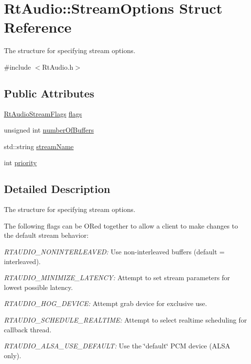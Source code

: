 \hypertarget{struct_rt_audio_1_1_stream_options}{}\section{Rt\+Audio\+:\+:Stream\+Options Struct Reference}
\label{struct_rt_audio_1_1_stream_options}


The structure for specifying stream options.  




{\ttfamily \#include $<$Rt\+Audio.\+h$>$}

\subsection*{Public Attributes}
\begin{DoxyCompactItemize}
\item 
\hyperlink{_rt_audio_8h_a2c0f59b200dcec4d4e760f9166b29c41}{Rt\+Audio\+Stream\+Flags} \hyperlink{struct_rt_audio_1_1_stream_options_a0ecc98b031aa3af49d09b781643e298b}{flags}
\item 
unsigned int \hyperlink{struct_rt_audio_1_1_stream_options_a75a14cfab903d0e1c091bc16aec80240}{number\+Of\+Buffers}
\item 
std\+::string \hyperlink{struct_rt_audio_1_1_stream_options_a2a4b0b8d690c624d20f4e8f4be6ca9ba}{stream\+Name}
\item 
int \hyperlink{struct_rt_audio_1_1_stream_options_adfd267059434edb21573c584e6367def}{priority}
\end{DoxyCompactItemize}


\subsection{Detailed Description}
The structure for specifying stream options. 

The following flags can be OR\textquotesingle{}ed together to allow a client to make changes to the default stream behavior\+:


\begin{DoxyItemize}
\item {\itshape R\+T\+A\+U\+D\+I\+O\+\_\+\+N\+O\+N\+I\+N\+T\+E\+R\+L\+E\+A\+V\+ED\+:} Use non-\/interleaved buffers (default = interleaved).
\item {\itshape R\+T\+A\+U\+D\+I\+O\+\_\+\+M\+I\+N\+I\+M\+I\+Z\+E\+\_\+\+L\+A\+T\+E\+N\+CY\+:} Attempt to set stream parameters for lowest possible latency.
\item {\itshape R\+T\+A\+U\+D\+I\+O\+\_\+\+H\+O\+G\+\_\+\+D\+E\+V\+I\+CE\+:} Attempt grab device for exclusive use.
\item {\itshape R\+T\+A\+U\+D\+I\+O\+\_\+\+S\+C\+H\+E\+D\+U\+L\+E\+\_\+\+R\+E\+A\+L\+T\+I\+ME\+:} Attempt to select realtime scheduling for callback thread.
\item {\itshape R\+T\+A\+U\+D\+I\+O\+\_\+\+A\+L\+S\+A\+\_\+\+U\+S\+E\+\_\+\+D\+E\+F\+A\+U\+LT\+:} Use the \char`\"{}default\char`\"{} P\+CM device (A\+L\+SA only).
\end{DoxyItemize}

